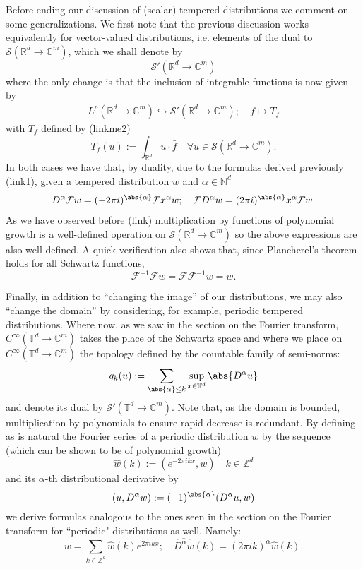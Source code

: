 \documentclass[
]{article}
\begin{document}
Before ending our discussion of (scalar) tempered distributions we
comment on some generalizations. We first note that the previous
discussion works equivalently for vector-valued distributions, i.e.
elements of the dual to \(\mathcal{S}({\mathbb R}^d\to\mathbb{C}^m)\),
which we shall denote by\[\mathcal{S}'({\mathbb R}^d\to\mathbb{C}^m)\]
where the only change is that the inclusion of integrable functions is
now given by \[\begin{aligned}
\label{lpisvectordistr}
    L^p({\mathbb R}^d\to\mathbb{C}^m)\hookrightarrow{\mathcal S}'({\mathbb R}^d\to\mathbb{C}^m);\quad f\mapsto T_f\end{aligned}\]
with \(T_f\) defined by (linkme2)
\[T_f(u):=\int_{{\mathbb R}^d} u\cdot \bar{f}\quad\forall{u}\in {{\mathcal S}({\mathbb R}^d\to\mathbb{C}^m)}.\]
In both cases we have that, by duality, due to the formulas derived
previously (link1), given a tempered distribution \(w\) and
\(\alpha\in \mathbb{N}^d\) \[\begin{aligned}
\label{derivativedistronperiodic}
    D^\alpha\mathcal{F}w =(-2\pi i)^{\abs{\alpha}}\mathcal{F}x^\alpha w;\quad
    \mathcal{F}D^{\alpha} w= (2\pi i)^{\abs{\alpha}}x^\alpha\mathcal{F}w.\end{aligned}\]
As we have observed before (link) multiplication by functions of
polynomial growth is a well-defined operation on
\({\mathcal S}({\mathbb R}^d\to\mathbb{C}^m)\) so the above expressions
are also well defined. A quick verification also shows that, since
Plancherel's theorem holds for all Schwartz functions,
\[\label{planchereldistr}
    \mathcal{F}^{-1}\mathcal{F}w=\mathcal{F}\mathcal{F}^{-1}w=w.\]

Finally, in addition to ``changing the image'' of our distributions, we
may also ``change the domain'' by considering, for example, periodic
tempered distributions. Where now, as we saw in the section on the
Fourier transform, \(C^\infty({\mathbb T}^d\to\mathbb{C}^m)\) takes the
place of the Schwartz space and where we place on
\(C^\infty({\mathbb T}^d\to\mathbb{C}^m)\) the topology defined by the
countable family of semi-norms:
\[q_k(u):=\sum_{\abs{\alpha}\leq k}\sup_{x\in{\mathbb T}^d}\abs{D^\alpha u}\]
and denote its dual by \({\mathcal S}'({\mathbb T}^d\to\mathbb{C}^m).\)
Note that, as the domain is bounded, multiplication by polynomials to
ensure rapid decrease is redundant. By defining as is natural the
Fourier series of a periodic distribution \(w\) by the sequence (which
can be shown to be of polynomial growth)
\[\label{fouriercoeffperiodicdist}
    \hat{w}(k):=(e^{-2\pi ikx},w)\quad k\in{\mathbb Z}^d\] and its
\(\alpha\)-th distributional derivative by
\[(u,D^\alpha w):=(-1)^\abs{\alpha}(D^\alpha u,w)\] we derive formulas
analogous to the ones seen in the section on the Fourier transform for
``periodic" distributions as well. Namely: \[\label{derivativedistr}
    w=\sum_{k\in{\mathbb Z}^d}\hat{w}(k)e^{2\pi i k x};\quad\widehat{D^\alpha w}(k)=(2\pi ik)^\alpha\hat{w}(k).\]
\end{document}
